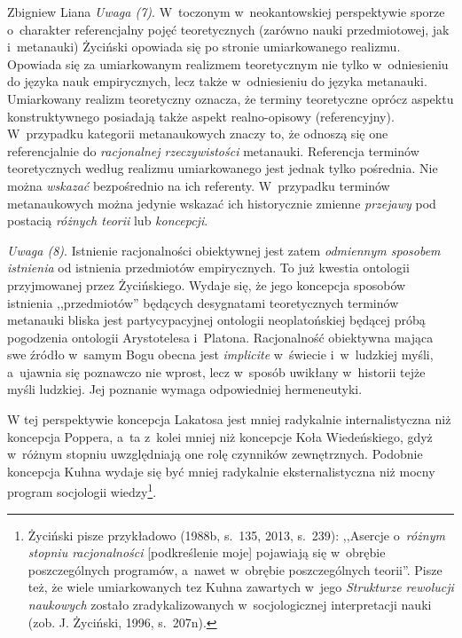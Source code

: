 \begin{artplenv}{Zbigniew Liana}
\textit{Uwaga (7)}. W~toczonym w~neokantowskiej perspektywie sporze o~charakter referencjalny pojęć teoretycznych (zarówno
nauki przedmiotowej, jak i~metanauki) Życiński opowiada się po stronie umiarkowanego realizmu. Opowiada się za
umiarkowanym realizmem teoretycznym nie tylko w~odniesieniu do języka nauk empirycznych, lecz także w~odniesieniu do
języka metanauki. Umiarkowany realizm teoretyczny oznacza, że terminy teoretyczne oprócz aspektu konstruktywnego
posiadają także aspekt realno-opisowy (referencyjny). W~przypadku kategorii metanaukowych znaczy to, że odnoszą się one
referencjalnie do \textit{racjonalnej rzeczywistości} metanauki. Referencja terminów teoretycznych według realizmu
umiarkowanego jest jednak tylko pośrednia. Nie można \textit{wskazać }bezpośrednio na ich referenty. W~przypadku terminów
metanaukowych można jedynie wskazać ich historycznie zmienne \textit{przejawy} pod postacią \textit{różnych teorii
}lub\textit{ koncepcji}.

\textit{Uwaga (8)}. Istnienie racjonalności obiektywnej jest zatem \textit{odmiennym sposobem istnienia} od istnienia
przedmiotów empirycznych. To już kwestia ontologii przyjmowanej przez Życińskiego. Wydaje się, że jego koncepcja
sposobów istnienia ,,przedmiotów'' będących desygnatami teoretycznych terminów metanauki bliska jest partycypacyjnej
ontologii neoplatońskiej będącej próbą pogodzenia ontologii Arystotelesa i~Platona. Racjonalność obiektywna mająca swe
źródło w~samym Bogu obecna jest \textit{implicite} w~świecie i~w~ludzkiej myśli, a~ujawnia się poznawczo nie wprost,
lecz w~sposób uwikłany w~historii tejże myśli ludzkiej. Jej poznanie wymaga odpowiedniej hermeneutyki.

W tej perspektywie koncepcja Lakatosa jest mniej radykalnie internalistyczna niż koncepcja Poppera, a~ta z~kolei mniej
niż koncepcje Koła Wiedeńskiego, gdyż w~różnym stopniu uwzględniają one rolę czynników zewnętrznych. Podobnie koncepcja
Kuhna wydaje się być mniej radykalnie eksternalistyczna niż mocny program socjologii wiedzy\footnote{Życiński pisze
przykładowo \label{ref:RNDMFFbOpIuQe}(1988b, s.~135, 2013, s.~239): ,,Asercje o~\textit{różnym stopniu racjonalności}
[podkreślenie moje] pojawiają się w~obrębie poszczególnych programów, a~nawet w~obrębie poszczególnych teorii''. Pisze
też, że wiele umiarkowanych tez Kuhna zawartych w~jego \textit{Strukturze rewolucji naukowych} zostało
zradykalizowanych w~socjologicznej interpretacji nauki \label{ref:RND7QncKOKY2H}(zob. J. Życiński, 1996, s.~207n).}.


\end{artplenv}
